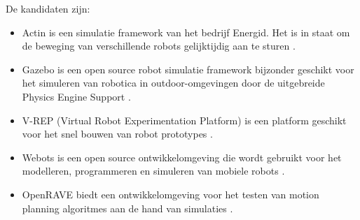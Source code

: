 \documentclass[a4paper, 11pt, oneside]{report}
\begin{document}
De kandidaten zijn:
\begin{itemize}
	\item Actin is een simulatie framework van het bedrijf Energid. Het is in staat om de beweging van verschillende robots gelijktijdig aan te sturen \cite{energid}.
	
	\item Gazebo is een open source robot simulatie framework bijzonder geschikt voor het simuleren van robotica in outdoor-omgevingen door de uitgebreide Physics Engine Support \cite{gazebo}.
	\item V-REP (Virtual Robot Experimentation Platform) is een platform geschikt voor het snel bouwen van robot prototypes \cite{vrep}.
	\item Webots is een open source ontwikkelomgeving die wordt gebruikt voor het modelleren, programmeren en simuleren van mobiele robots \cite{webots}.
	\item OpenRAVE biedt een ontwikkelomgeving voor het testen van motion planning algoritmes aan de hand van simulaties \cite{openrave}.
\end{itemize}
\end{document}
